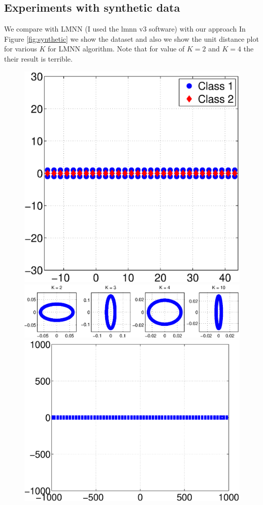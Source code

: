 \documentclass{article}
\begin{document}
 
 
 

\clearpage
\subsection{Experiments with synthetic data}


We compare with LMNN (I used the lmnn v3 software)
with our approach
In Figure \ref{fig:synthetic} we show the dataset
and also we show the unit distance plot for various $K$ for LMNN algorithm.
Note that for value of $K=2$ and $K=4$ the their result is terrible.
\begin{figure}[h!]

\includegraphics[scale=.2]{fig/synthetic1.eps}
\includegraphics[scale=.3]{fig/synthetic1lmnn.eps}
\includegraphics[scale=.2]{fig/synthetic1our.eps}


\end{figure}
\end{document}
